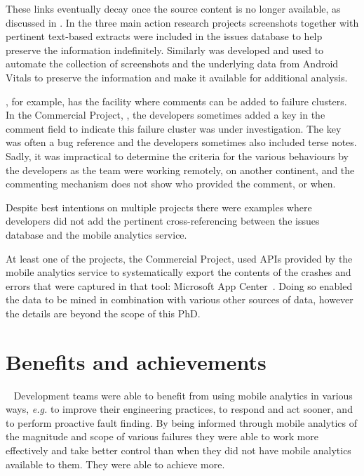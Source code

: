 These links eventually decay once the source content is no longer available, as discussed in . In the three main action research projects screenshots together with pertinent text-based extracts were included in the issues database to help preserve the information indefinitely. Similarly  was developed and used to automate the collection of screenshots and the underlying data from Android Vitals to preserve the information and make it available for additional analysis.

, for example, has the facility where comments can be added to failure clusters. In the Commercial Project, , the developers sometimes added a key in the comment field to indicate this failure cluster was under investigation. The key was often a bug reference and the developers sometimes also included terse notes. Sadly, it was impractical to determine the criteria for the various behaviours by the developers as the team were working remotely, on another continent, and the commenting mechanism does not show who provided the comment, or when.

Despite best intentions on multiple projects there were examples where developers did not add the pertinent cross-referencing between the issues database and the mobile analytics service. %

At least one of the projects, the Commercial Project, used APIs provided by the mobile analytics service to systematically export the contents of the crashes and errors that were captured in that tool: Microsoft App Center~. Doing so enabled the data to be mined in combination with various other sources of data, however the details are beyond the scope of this PhD.


\section{Benefits and achievements}~\label{aiu-benefits-and-achievements-section}
Development teams were able to benefit from using mobile analytics in various ways, \emph{e.g.} to improve their engineering practices, to respond and act sooner, and to perform proactive fault finding. By being informed through mobile analytics of the magnitude and scope of various failures they were able to work more effectively and take better control than when they did not have mobile analytics available to them. They were able to achieve more.

